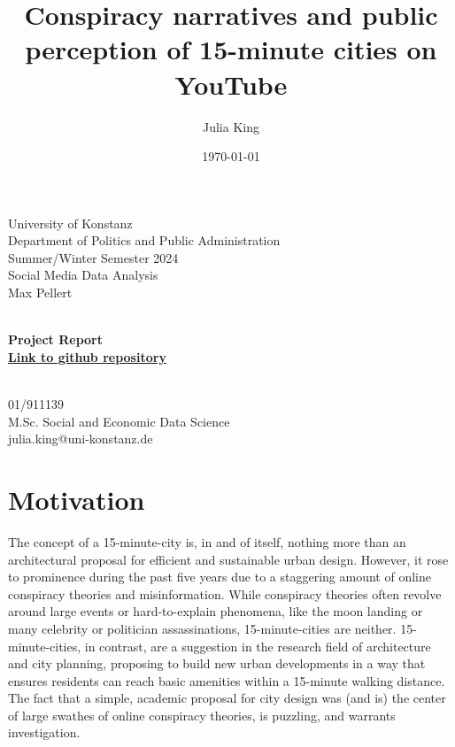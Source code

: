 \documentclass[fontsize=11pt, parskip=half]{scrartcl}
\title{Conspiracy narratives and public perception of 15-minute cities on YouTube}\let\Title\@title
\author{Julia King}          \let\Author\@author
\date{\today}           \let\Date\@date
\makeatletter
\def \papersubtitle {Project Report}
\def \paperdeadline {\href{https://github.com/julia-king-edu/so-24_smda_project}{Link to github repository}}
\def \paperevaluator {Max Pellert}
\def \paperseminar {Social Media Data Analysis}
\def \papersemester {Summer/Winter Semester 2024}
\def \paperdepartment {Department of Politics and Public Administration}
\def \paperuniversity {University of Konstanz}
\def \paperemail {julia.king@uni-konstanz.de}
\def \paperprogramme {M.Sc. Social and Economic Data Science}
\def \papermatriculationnr {01/911139}
\makeatother
\begin{document}
\setlength{\columnsep}{25pt}

\begin{titlepage}
    \newcommand{\HRule}{\rule{\linewidth}{0.5mm}}
    
    \begin{flushleft} %
        \large
        \paperuniversity\\
        \paperdepartment\\
        \papersemester\\
        \paperseminar\\
        \paperevaluator
    \end{flushleft}
    
    \vfill
    
    \begin{center} %
        \huge\bfseries \Title\\
        \vspace{0.5cm}
        \large \papersubtitle \\
        \vspace{0.5cm}
        \small \paperdeadline
    \end{center}
    
    \vfill
    
    \begin{flushright} %
        \large
        \Author\\
        \papermatriculationnr\\
        \paperprogramme\\
        \paperemail
    \end{flushright}
\end{titlepage}

\clearpage
\setcounter{page}{1}

\section{Motivation}
\label{section:motivation}

    The concept of a 15-minute-city is, in and of itself, nothing more than an architectural proposal for efficient and sustainable urban design. However, it rose to prominence during the past five years due to a staggering amount of online conspiracy theories and misinformation. While conspiracy theories often revolve around large events or hard-to-explain phenomena, like the moon landing or many celebrity or politician assassinations, 15-minute-cities are neither. 15-minute-cities, in contrast, are a suggestion in the research field of architecture and city planning, proposing to build new urban developments in a way that ensures residents can reach basic amenities within a 15-minute walking distance. The fact that a simple, academic proposal for city design was (and is) the center of large swathes of online conspiracy theories, is puzzling, and warrants investigation. 
    
\end{document}
